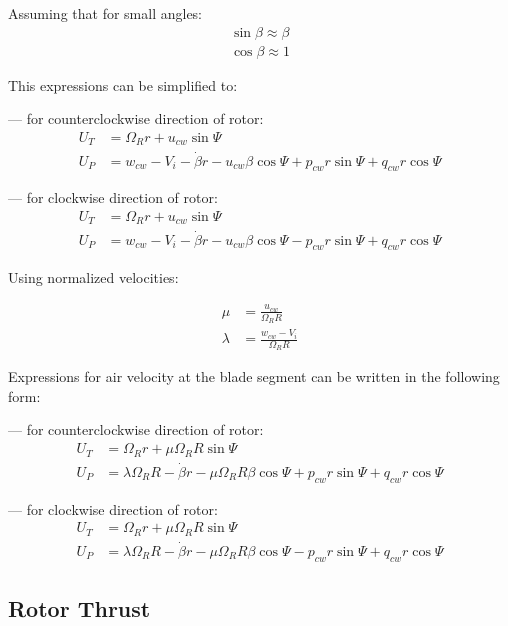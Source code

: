 Assuming that for small angles:
\begin{align}
  \label{eq-aero-sin-beta-approx}
  \sin \beta \approx \beta \\
  \label{eq-aero-cos-beta-approx}
  \cos \beta \approx 1
\end{align}

This expressions can be simplified to:

--- for counterclockwise direction of rotor:
\begin{align}
  U_T &= \Omega_R r + u_{cw} \sin \Psi \\
  U_P &=
  w_{cw} - V_i - \dot \beta r - u_{cw} \beta \cos \Psi
  + p_{cw} r \sin \Psi + q_{cw} r \cos \Psi
\end{align}

--- for clockwise direction of rotor:
  \begin{align}
    U_T &= \Omega_R r + u_{cw} \sin \Psi \\
    U_P &=
    w_{cw} - V_i - \dot \beta r - u_{cw} \beta \cos \Psi
    - p_{cw} r \sin \Psi + q_{cw} r \cos \Psi
  \end{align}

Using normalized velocities:

\begin{align}
  \mu     &= \frac{u_{cw}}{\Omega_R R} \\
  \lambda &= \frac{w_{cw} - V_i}{\Omega_R R}
\end{align}

Expressions for air velocity at the blade segment can be written in the following form:

--- for counterclockwise direction of rotor:
\begin{align}
  U_T &= \Omega_R r + \mu \Omega_R R \sin \Psi \\
  U_P &=
  \lambda \Omega_R R - \dot \beta r - \mu \Omega_R R \beta \cos \Psi
  + p_{cw} r \sin \Psi + q_{cw} r \cos \Psi
\end{align}

--- for clockwise direction of rotor:
\begin{align}
  U_T &= \Omega_R r + \mu \Omega_R R \sin \Psi \\
  U_P &=
  \lambda \Omega_R R - \dot \beta r - \mu \Omega_R R \beta \cos \Psi
  - p_{cw} r \sin \Psi + q_{cw} r \cos \Psi
\end{align}

\subsection{Rotor Thrust}

